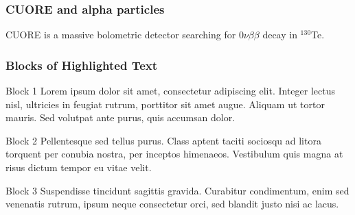 \documentclass{beamer}
\begin{document}


	\begin{frame}
		\frametitle{CUORE and alpha particles}
			
		CUORE is a massive bolometric detector searching for $0\nu\beta\beta$ decay in $^{130}$Te.
	
	\end{frame}
	
	
	
	
	
	




	
	
	\begin{frame}
		\frametitle{Blocks of Highlighted Text}
		\begin{block}{Block 1}
			Lorem ipsum dolor sit amet, consectetur adipiscing elit. Integer lectus nisl, ultricies in feugiat rutrum, porttitor sit amet augue. Aliquam ut tortor mauris. Sed volutpat ante purus, quis accumsan dolor.
		\end{block}
		
		\begin{block}{Block 2}
			Pellentesque sed tellus purus. Class aptent taciti sociosqu ad litora torquent per conubia nostra, per inceptos himenaeos. Vestibulum quis magna at risus dictum tempor eu vitae velit.
		\end{block}
		
		\begin{block}{Block 3}
			Suspendisse tincidunt sagittis gravida. Curabitur condimentum, enim sed venenatis rutrum, ipsum neque consectetur orci, sed blandit justo nisi ac lacus.
		\end{block}
	\end{frame}
	
\end{document}
